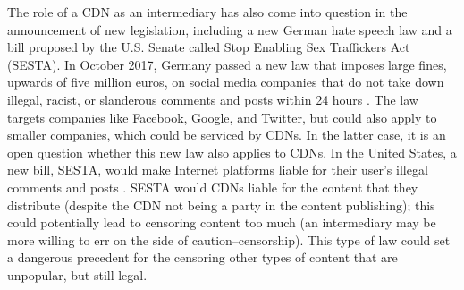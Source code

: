 The role of a CDN as an intermediary has also come into question in the announcement of new legislation, including a new German hate speech law and 
a bill proposed by the U.S. Senate called Stop Enabling Sex Traffickers Act (SESTA).  In October 2017, Germany passed a new law that imposes large fines, upwards of five million euros,
on social media companies that do not take down illegal, racist, or slanderous comments and posts within 24 hours \cite{nytimes_hatespeech}.  The law 
targets companies like Facebook, Google, and Twitter, but could also apply to smaller companies, which could be serviced by CDNs.  In the latter case, it is 
an open question whether this new law also applies to CDNs.  In the United States, a new bill, SESTA, would make Internet platforms liable for their user's illegal comments 
and posts \cite{medium_sesta}.  SESTA would CDNs liable for the content that they distribute (despite the CDN not being a party in the content publishing); this could potentially lead to 
censoring content too much (an intermediary may be more willing to err on the side of caution--censorship).  This type of law could set a dangerous precedent 
for the censoring other types of content that are unpopular, but still legal. 
